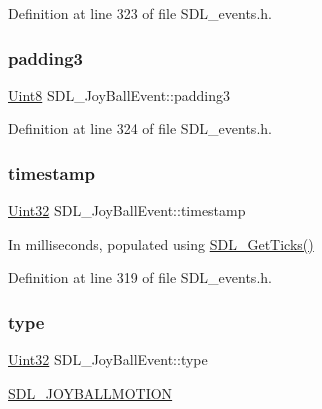 Definition at line 323 of file S\+D\+L\+\_\+events.\+h.

\mbox{\label{struct_s_d_l___joy_ball_event_acb700712f1a4070bc114ef9d55b00640}} 
\subsubsection{\texorpdfstring{padding3}{padding3}}
{\footnotesize\ttfamily \mbox{\hyperlink{_s_d_l__stdinc_8h_a2944638813a090aa23e62f4da842c3e2}{Uint8}} S\+D\+L\+\_\+\+Joy\+Ball\+Event\+::padding3}



Definition at line 324 of file S\+D\+L\+\_\+events.\+h.

\mbox{\label{struct_s_d_l___joy_ball_event_aa8e4fb91af62e316bb9a3219ab76148d}} 
\subsubsection{\texorpdfstring{timestamp}{timestamp}}
{\footnotesize\ttfamily \mbox{\hyperlink{_s_d_l__stdinc_8h_add440eff171ea5f55cb00c4a9ab8672d}{Uint32}} S\+D\+L\+\_\+\+Joy\+Ball\+Event\+::timestamp}

In milliseconds, populated using \mbox{\hyperlink{_s_d_l__timer_8h_a0b9bc71d6287e0ffafdc3419760fe2b3}{S\+D\+L\+\_\+\+Get\+Ticks()}} 

Definition at line 319 of file S\+D\+L\+\_\+events.\+h.

\mbox{\label{struct_s_d_l___joy_ball_event_a0b192b95a043cb494b27ed9b27e84db1}} 
\subsubsection{\texorpdfstring{type}{type}}
{\footnotesize\ttfamily \mbox{\hyperlink{_s_d_l__stdinc_8h_add440eff171ea5f55cb00c4a9ab8672d}{Uint32}} S\+D\+L\+\_\+\+Joy\+Ball\+Event\+::type}

\mbox{\hyperlink{_s_d_l__events_8h_a3b589e89be6b35c02e0dd34a55f3fccaa78f859489cfd565c305c7f6f9d5b25c1}{S\+D\+L\+\_\+\+J\+O\+Y\+B\+A\+L\+L\+M\+O\+T\+I\+ON}} 

